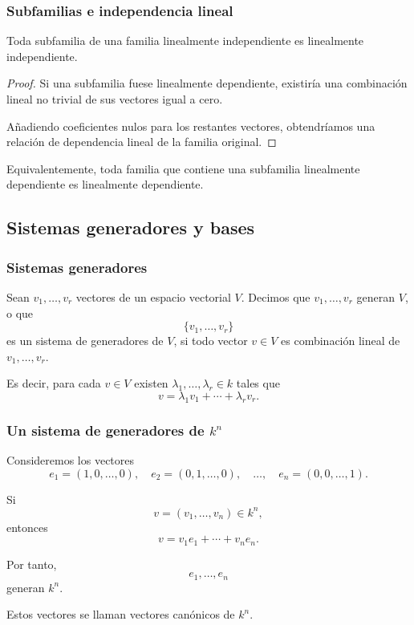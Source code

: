 \begin{frame}
    \frametitle{Subfamilias e independencia lineal}

    \begin{proposition}
        Toda subfamilia de una familia linealmente independiente
        es linealmente independiente.
    \end{proposition}

    \begin{proof}
        Si una subfamilia fuese linealmente dependiente, existiría una
        combinación lineal no trivial de sus vectores igual a cero.

        Añadiendo coeficientes nulos para los restantes vectores,
        obtendríamos una relación de dependencia lineal de la familia
        original.
    \end{proof}

    \medskip

    Equivalentemente, toda familia que contiene una subfamilia
    linealmente dependiente es linealmente dependiente.
\end{frame}


\subsection{Sistemas generadores y bases}

\begin{frame}
    \frametitle{Sistemas generadores}

    \begin{definition}
        Sean \(v_1,\ldots,v_r\) vectores de un espacio vectorial \(V\).
        Decimos que \(v_1,\ldots,v_r\) \alert{generan} \(V\), o que
        \[
            \{v_1,\ldots,v_r\}
        \]
        es un \alert{sistema de generadores} de \(V\), si todo vector
        \(v\in V\) es combinación lineal de \(v_1,\ldots,v_r\).

        Es decir, para cada \(v\in V\) existen
        \(\lambda_1,\ldots,\lambda_r\in k\) tales que
        \[
            v=\lambda_1v_1+\cdots+\lambda_rv_r.
        \]
    \end{definition}
\end{frame}


\begin{frame}
    \frametitle{Un sistema de generadores de \(k^n\)}

    Consideremos los vectores
    \[
        e_1=(1,0,\ldots,0),\quad
        e_2=(0,1,\ldots,0),\quad\ldots,\quad
        e_n=(0,0,\ldots,1).
    \]

    Si
    \[
        v=(v_1,\ldots,v_n)\in k^n,
    \]
    entonces
    \[
        v=v_1e_1+\cdots+v_ne_n.
    \]

    Por tanto,
    \[
        e_1,\ldots,e_n
    \]
    generan \(k^n\).

    \medskip

    Estos vectores se llaman \alert{vectores canónicos} de \(k^n\).
\end{frame}


